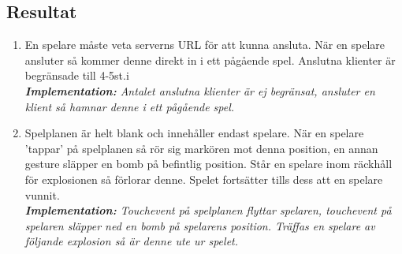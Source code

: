 \documentclass[10pt, titlepage, oneside, a4paper]{article}
\begin{document}
    	
    	
    	\newpage
    	\subsection{Resultat}
    	
    	\begin{enumerate}
			\item En spelare måste veta serverns URL för att kunna ansluta. När en spelare ansluter så kommer denne direkt in i ett pågående spel. Anslutna klienter är begränsade till 4-5st.i\\\textit{\textbf{Implementation:} Antalet anslutna klienter är ej begränsat, ansluter en klient så hamnar denne i ett pågående spel.}
			
			\item Spelplanen är helt blank och innehåller endast spelare. När en spelare 'tappar' på spelplanen så rör sig markören mot denna position, en annan gesture släpper en bomb på befintlig position. Står en spelare inom räckhåll för explosionen så förlorar denne. Spelet fortsätter tills dess att en spelare vunnit.\\\textit{\textbf{Implementation:} Touchevent på spelplanen flyttar spelaren, touchevent på spelaren släpper ned en bomb på spelarens position. Träffas en spelare av följande explosion så är denne ute ur spelet.}
			

\end{enumerate}
\end{document}
